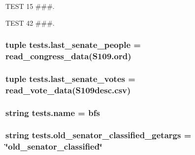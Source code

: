 T\+E\+S\+T 15 \#\#\#. 

T\+E\+S\+T 42 \#\#\#. \hypertarget{namespacetests_a7cb20260e3fc93bf8ad640536ecadffb}{}
\subsubsection[{last\+\_\+senate\+\_\+people}]{\setlength{\rightskip}{0pt plus 5cm}tuple tests.\+last\+\_\+senate\+\_\+people = read\+\_\+congress\+\_\+data(\textquotesingle{}S109.\+ord\textquotesingle{})}\label{namespacetests_a7cb20260e3fc93bf8ad640536ecadffb}
\hypertarget{namespacetests_a1b751b1ec5f355204f200d073c890707}{}
\subsubsection[{last\+\_\+senate\+\_\+votes}]{\setlength{\rightskip}{0pt plus 5cm}tuple tests.\+last\+\_\+senate\+\_\+votes = read\+\_\+vote\+\_\+data(\textquotesingle{}S109desc.\+csv\textquotesingle{})}\label{namespacetests_a1b751b1ec5f355204f200d073c890707}
\hypertarget{namespacetests_a44eb36c9e4890a53d35373eb8836d3a0}{}
\subsubsection[{name}]{\setlength{\rightskip}{0pt plus 5cm}string tests.\+name = \textquotesingle{}bfs\textquotesingle{}}\label{namespacetests_a44eb36c9e4890a53d35373eb8836d3a0}
\hypertarget{namespacetests_a817ad020cbf0a5aadfd994ae0454d35f}{}
\subsubsection[{old\+\_\+senator\+\_\+classified\+\_\+getargs}]{\setlength{\rightskip}{0pt plus 5cm}string tests.\+old\+\_\+senator\+\_\+classified\+\_\+getargs = \char`\"{}old\+\_\+senator\+\_\+classified\char`\"{}}\label{namespacetests_a817ad020cbf0a5aadfd994ae0454d35f}
\hypertarget{namespacetests_a0245f1ca98b1be40726e6fdd05e82d1a}{}
